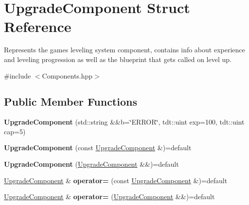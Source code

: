 \hypertarget{struct_upgrade_component}{}\section{Upgrade\+Component Struct Reference}
\label{struct_upgrade_component}


Represents the game\textquotesingle{}s leveling system component, contains info about experience and leveling progression as well as the blueprint that gets called on level up.  




{\ttfamily \#include $<$Components.\+hpp$>$}

\subsection*{Public Member Functions}
\begin{DoxyCompactItemize}
\item 
{\bfseries Upgrade\+Component} (std\+::string \&\&b=\char`\"{}E\+R\+R\+OR\char`\"{}, tdt\+::uint exp=100, tdt\+::uint cap=5)\hypertarget{struct_upgrade_component_a69af5ff48cb7ec6ce960e6d80289ba85}{}\label{struct_upgrade_component_a69af5ff48cb7ec6ce960e6d80289ba85}

\item 
{\bfseries Upgrade\+Component} (const \hyperlink{struct_upgrade_component}{Upgrade\+Component} \&)=default\hypertarget{struct_upgrade_component_a140db550d9998fb3244e95d59b8221b8}{}\label{struct_upgrade_component_a140db550d9998fb3244e95d59b8221b8}

\item 
{\bfseries Upgrade\+Component} (\hyperlink{struct_upgrade_component}{Upgrade\+Component} \&\&)=default\hypertarget{struct_upgrade_component_abeb73cb8e09b4246e0d7db65a6269e0d}{}\label{struct_upgrade_component_abeb73cb8e09b4246e0d7db65a6269e0d}

\item 
\hyperlink{struct_upgrade_component}{Upgrade\+Component} \& {\bfseries operator=} (const \hyperlink{struct_upgrade_component}{Upgrade\+Component} \&)=default\hypertarget{struct_upgrade_component_a618a2eb7310699f380607c75da212b4a}{}\label{struct_upgrade_component_a618a2eb7310699f380607c75da212b4a}

\item 
\hyperlink{struct_upgrade_component}{Upgrade\+Component} \& {\bfseries operator=} (\hyperlink{struct_upgrade_component}{Upgrade\+Component} \&\&)=default\hypertarget{struct_upgrade_component_af47647e904ffcf6483c61c3447d41bc4}{}\label{struct_upgrade_component_af47647e904ffcf6483c61c3447d41bc4}

\end{DoxyCompactItemize}
